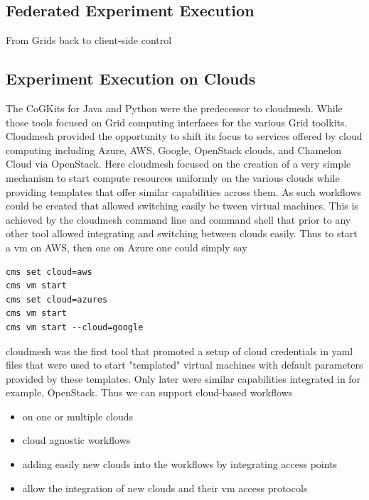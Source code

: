 \documentclass[utf8]{FrontiersinVancouver} %
\begin{document}
\subsection{Federated Experiment Execution}

From Grids back to client-side control

\subsection{Experiment Execution on Clouds}

The CoGKits for Java and Python were the predecessor to cloudmesh. While those tools focused on Grid computing interfaces for the various Grid toolkits. Cloudmesh provided the opportunity to shift its focus to services offered by cloud computing including Azure, AWS, Google, OpenStack clouds, and Chamelon Cloud via OpenStack. Here cloudmesh focused on the creation of a very simple mechanism to start compute resources uniformly on the various clouds while providing templates that offer similar capabilities across them. As such workflows could be created that allowed switching easily be tween virtual machines. This is achieved by the cloudmesh command line and command shell that prior to any other tool allowed integrating and switching between clouds easily. Thus to start a vm on AWS, then one on Azure one could simply say

\begin{verbatim}
cms set cloud=aws
cms vm start
cms set cloud=azures
cms vm start
cms vm start --cloud=google
\end{verbatim}

cloudmesh was the first tool that promoted a setup of cloud credentials in yaml files that were used to start "templated" virtual machines with default parameters provided by these templates. Only later were similar capabilities integrated in for example,  OpenStack. Thus we can support cloud-based workflows

\begin{itemize}
    \item on one or multiple clouds
    \item cloud agnostic workflows
    \item adding easily new clouds into the workflows by integrating access points
    \item allow the integration of new clouds and their vm access protocols
\end{itemize}
\end{document}
